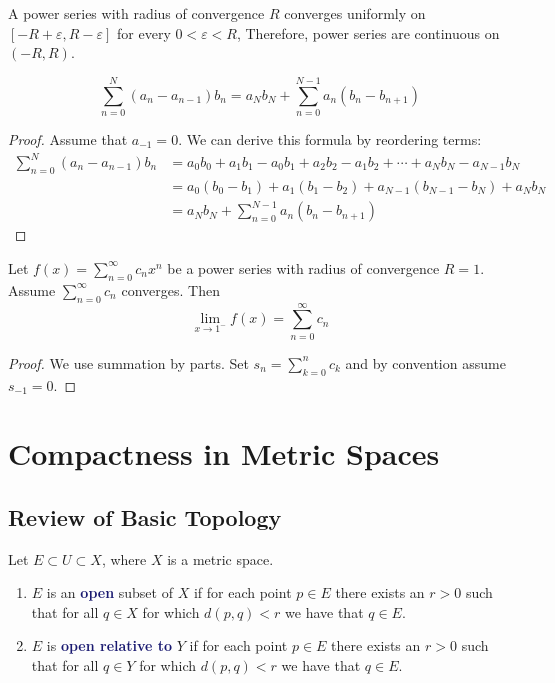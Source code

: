 \documentclass[11pt]{article}
\numberwithin{equation}{section}
\newcommand{\navy}[1]{\textcolor{MidnightBlue}{\bf #1}}
\theoremstyle{definition}
\theoremstyle{definition}
\newcommand{\1}{\mathbbm 1}
\newcommand{\e}{\varepsilon}
\begin{document}
\begin{theorem}
	A power series with radius of convergence $R$ converges uniformly on $[-R + \e, R- \e]$ for every $0 < \e < R$, Therefore, power series are continuous on $(-R,R)$.
\end{theorem}

\begin{theorem}
	\begin{equation}
		\sum_{n=0}^N (a_n - a_{n-1})b_n = a_Nb_N + \sum_{n=0}^{N-1}a_n(b_n - b_{n+1})
	\end{equation}
\end{theorem}
\begin{proof}
	Assume that $a_{-1} = 0$. We can derive this formula by reordering terms:
	\begin{align*}
		\sum_{n=0}^N (a_n - a_{n-1})b_n &= a_0b_0 + a_1b_1 - a_0b_1 + a_2b_2 - a_1b_2 + \cdots + a_{N}b_N - a_{N-1}b_N \\
		&= a_0(b_0 - b_1) + a_1(b_1 - b_2) + a_{N-1}(b_{N-1} - b_N) + a_N b_N \\
		&= a_Nb_N + \sum_{n=0}^{N-1}a_n(b_n - b_{n+1})
	\end{align*}
	
\end{proof}

\begin{theorem}[Abel]
	Let $f(x) = \sum_{n=0}^\infty c_n x^n$ be a power series with radius of convergence $R=1$. Assume $\sum_{n=0}^\infty c_n$ converges. Then 
	\begin{equation}
		\lim_{x \to 1^-} f(x) = \sum_{n=0}^\infty c_n
	\end{equation}
\end{theorem}
\begin{proof}
	We use summation by parts. Set $s_n = \sum_{k=0}^n c_k$ and by convention assume $s_{-1} = 0$. 
\end{proof}

\section{Compactness in Metric Spaces}

\subsection{Review of Basic Topology}

\begin{definition}
	Let $E \subset U \subset X$, where $X$ is a metric space. 
	\begin{enumerate}
		\item $E$ is an \navy{open} subset of $X$ if for each point $p \in E$ there exists an $r > 0$ such that for all $q \in X$ for which $d(p,q) < r$ we have that $q \in E$. 
		\item $E$ is \navy{open relative to} $Y$ if for each point $p \in E$ there exists an $r > 0$ such that for all $q \in Y$ for which $d(p,q) < r$ we have that $q \in E$.
	\end{enumerate}
\end{definition}
\end{document}
